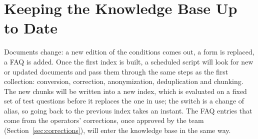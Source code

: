 \section{Keeping the Knowledge Base Up to Date}
\label{sec:updates}

Documents change: a new edition of the conditions comes out, a form is replaced, a FAQ is added.
Once the first index is built, a scheduled script will look for new or updated documents and pass
them through the same steps as the first collection: conversion, correction, anonymization,
deduplication and chunking. The new chunks will be written into a new index, which is evaluated on
a fixed set of test questions before it replaces the one in use; the switch is a change of alias,
so going back to the previous index takes an instant. The FAQ entries that come from the operators'
corrections, once approved by the team (Section~\ref{sec:corrections}), will enter the knowledge
base in the same way.
\fi

